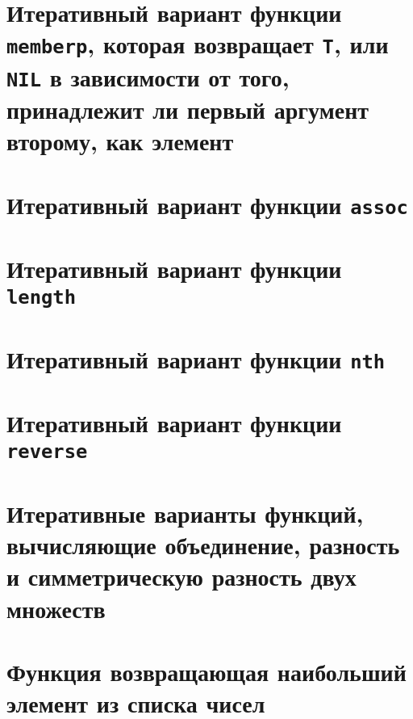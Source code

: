 
\section{Итеративный вариант функции \texttt{memberp}, которая возвращает \texttt{T}, или \texttt{NIL} в зависимости от того, принадлежит ли первый аргумент второму, как элемент}




\section{Итеративный вариант функции \texttt{assoc}}




\section{Итеративный вариант функции \texttt{length}}




\section{Итеративный вариант функции \texttt{nth}}




\section{Итеративный вариант функции \texttt{reverse}}




\section{Итеративные варианты функций, вычисляющие объединение, разность и симметрическую разность двух множеств}




\section{Функция возвращающая наибольший элемент из списка чисел}

